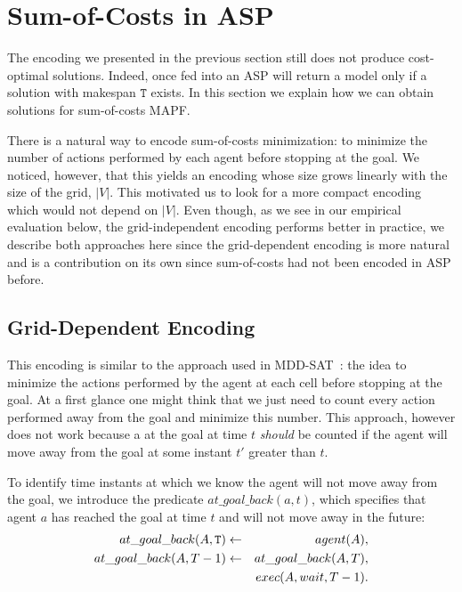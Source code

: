 \section{Sum-of-Costs in ASP}
The encoding we presented in the previous section still does not produce cost-optimal solutions. Indeed, once fed into an ASP will return a model only if a solution with makespan $\mathtt{T}$ exists. In this section we explain how we can obtain solutions for sum-of-costs MAPF.

There is a natural way to encode sum-of-costs minimization: to minimize the number of actions performed by each agent before stopping at the goal. We noticed, however, that this yields an encoding whose size grows linearly with the size of the grid, $|V|$. This motivated us to look for a more compact encoding which would not depend on $|V|$. Even though, as we see in our empirical evaluation below, the grid-independent encoding performs better in practice, we describe both approaches here since the grid-dependent encoding is more natural and is a contribution on its own since sum-of-costs had not been encoded in ASP before.

\subsection{Grid-Dependent Encoding}
This encoding is similar to the approach used in MDD-SAT~\cite{SurynekFSB16}: the idea to minimize the actions performed by the agent at each cell before stopping at the goal. At a first glance one might think that we just need to count every action performed away from the goal and minimize this number. This approach, however does not work because a \Wait at the goal at time $t$ \emph{should} be counted if the agent will move away from the goal at some instant $t'$ greater than $t$.

To identify time instants at which we know the agent will not move away from the goal, we introduce the predicate $at\_goal\_back(a,t)$, which specifies that agent $a$ has reached the goal at time $t$  and will not move away in the future:
\begin{eqnarray*}\small
    at\_goal\_back(A,\mathtt{T}) &\leftarrow& agent(A), \\
    at\_goal\_back(A,T-1) &\leftarrow &at\_goal\_back(A,T),\\
    &&exec(A,wait,T-1).
  \end{eqnarray*}


